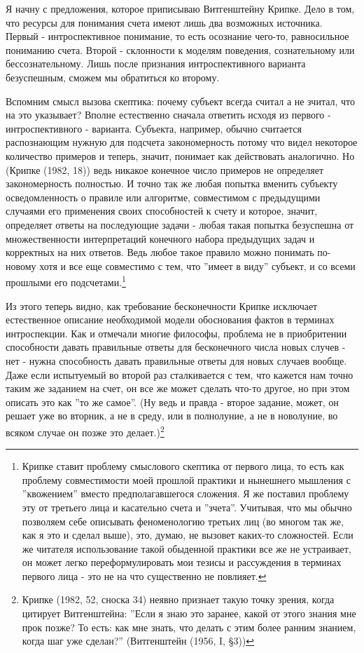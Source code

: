 \documentclass{book}
\begin{document}
Я начну с предложения, которое приписываю Витгенштейну Крипке. Дело в том, что ресурсы для понимания счета имеют лишь два возможных источника. Первый - интроспективное понимание, то есть осознание чего-то, равносильное пониманию счета. Второй - склонности к моделям поведения, сознательному или бессознательному. Лишь после признания интроспективного варианта безуспешным, сможем мы обратиться ко второму.

Вспомним смысл вызова скептика: почему субъект всегда считал а не зчитал, что на это указывает? Вполне естественно сначала ответить исходя из первого - интроспективного - варианта. Субъекта, например, обычно считается распознающим нужную для подсчета закономерность потому что видел некоторое количество примеров и теперь, значит, понимает как действовать аналогично. Но (Крипке (1982, 18)) ведь никакое конечное число примеров не определяет закономерность полностью. И точно так же любая попытка вменить субъекту осведомленность о правиле или алгоритме, совместимом с предыдущими случаями его применения своих способностей к счету и которое, значит, определяет ответы на последующие задачи - любая такая попытка безуспешна от множественности интерпретаций конечного набора предыдущих задач и корректных на них ответов. Ведь любое такое правило можно понимать по-новому хотя и все еще совместимо с тем, что ''имеет в виду'' субъект, и со всеми прошлыми его подсчетами.\footnote{Крипке ставит проблему смыслового скептика от первого лица, то есть как проблему совместимости моей прошлой практики и нынешнего мышления с ''квожением'' вместо предполагавшегося сложения. Я же поставил проблему эту от третьего лица и касательно счета и ''зчета''. Учитывая, что мы обычно позволяем себе описывать феноменологию третьих лиц (во многом так же, как я это и сделал выше), это, думаю, не вызовет каких-то сложностей. Если же читателя использование такой обыденной практики все же не устраивает, он может легко переформулировать мои тезисы и рассуждения в терминах первого лица - это не на что существенно не повлияет.}

Из этого теперь видно, как требование бесконечности Крипке исключает естественное описание необходимой модели обоснования фактов в терминах интроспекции. Как и отмечали многие философы, проблема не в приобритении способности давать правильные ответы для бесконечного числа новых случев - нет - нужна способность давать правильные ответы для новых случаев вообще. Даже если испытуемый во второй раз сталкивается с тем, что кажется нам точно таким же заданием на счет, он все же может сделать что-то другое, но при этом описать это как ''то же самое''. (Ну ведь и правда - второе задание, может, он решает уже во вторник, а не в среду, или в полнолуние, а не в новолуние, во всяком случае он позже это делает.)\footnote{Крипке (1982, 52, сноска 34) неявно признает такую точку зрения, когда цитирует Витгенштейна: ''Если я знаю это заранее, какой от этого знания мне прок позже? То есть: как мне знать, что делать с этим более ранним знанием, когда шаг уже сделан?'' (Витгенштейн (1956, I, §3))}
\end{document}
